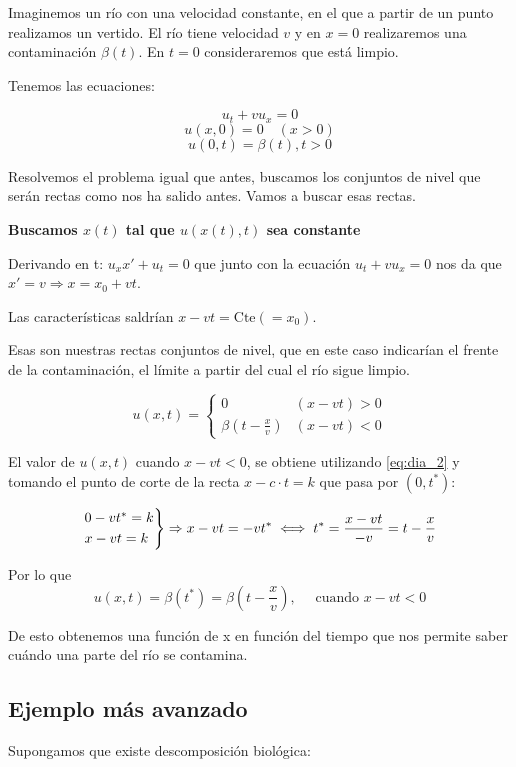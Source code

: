 \documentclass[palatino]{apuntes}
\begin{document}
Imaginemos un río con una velocidad constante, en el que a partir de un punto realizamos un vertido. El río tiene velocidad $v$ y en $x=0$ realizaremos una contaminación $\beta(t)$. En $t=0$ consideraremos que está limpio.

Tenemos las ecuaciones:

$$u_t + vu_x = 0$$
$$u(x,0) = 0 \quad (x>0) $$
$$u(0,t) = \beta(t), t>0$$


Resolvemos el problema igual que antes, buscamos los conjuntos de nivel que serán rectas como nos ha salido antes. Vamos a buscar esas rectas.

\textbf{Buscamos $x(t)$ tal que $u(x(t),t)$ sea constante}

Derivando en t: $u_x x' + u_t = 0$ que junto con la ecuación $u_t + v u_x = 0$ nos da que $x' = v \Rightarrow x = x_0 + vt $.

Las características saldrían \(x-vt = \text{Cte}(=x_0) \label{eq:dia_2}\).

Esas son nuestras rectas conjuntos de nivel, que en este caso indicarían el frente de la contaminación, el límite a partir del cual el río sigue limpio.

$$u(x,t) =
	\begin{cases}
		0                      & (x-vt) > 0 \\
		\beta(t - \frac{x}{v}) & (x-vt) < 0
	\end{cases}
$$

El valor de $u(x,t)$ cuando $x-vt < 0$, se obtiene utilizando \ref{eq:dia_2} y tomando el punto de corte de la recta $x-c \cdot t=k$ que pasa por $(0,t^*)$:

$$
\begin{rcases}
	0 - vt^{*} = k \\
	x - vt = k
\end{rcases}
 \Rightarrow x-vt = -vt^{*} \iff t^* = \frac{x-vt}{-v} = t - \frac{x}{v}$$

Por lo que
$$u(x,t) = \beta(t^*) = \beta(t - \frac{x}{v}), \quad \text{ cuando } x - vt < 0$$

De esto obtenemos una función de x en función del tiempo que nos permite saber cuándo una parte del río se contamina.

\subsection{Ejemplo más avanzado}

Supongamos que existe descomposición biológica:
\end{document}
